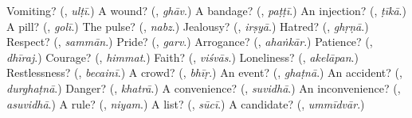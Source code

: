 \begin{tcolorbox}[breakable,colback=teal!4,colframe=teal!35!black,title={Before you move on}]
Vomiting? (\textbf{}, \emph{ulṭī}.) A wound? (\textbf{}, \emph{ghāv}.) A bandage? (\textbf{}, \emph{paṭṭī}.) An injection? (\textbf{}, \emph{ṭīkā}.) A pill? (\textbf{}, \emph{golī}.) The pulse? (\textbf{}, \emph{nabz}.) Jealousy? (\textbf{}, \emph{irṣyā}.) Hatred? (\textbf{}, \emph{ghṛṇā}.) Respect? (\textbf{}, \emph{sammān}.) Pride? (\textbf{}, \emph{garv}.) Arrogance? (\textbf{}, \emph{ahaṅkār}.) Patience? (\textbf{}, \emph{dhīraj}.) Courage? (\textbf{}, \emph{himmat}.) Faith? (\textbf{}, \emph{viśvās}.) Loneliness? (\textbf{}, \emph{akelāpan}.) Restlessness? (\textbf{}, \emph{becainī}.) A crowd? (\textbf{}, \emph{bhīṛ}.) An event? (\textbf{}, \emph{ghaṭnā}.) An accident? (\textbf{}, \emph{durghaṭnā}.) Danger? (\textbf{}, \emph{khatrā}.) A convenience? (\textbf{}, \emph{suvidhā}.) An inconvenience? (\textbf{}, \emph{asuvidhā}.) A rule? (\textbf{}, \emph{niyam}.) A list? (\textbf{}, \emph{sūcī}.) A candidate? (\textbf{}, \emph{ummīdvār}.)
\end{tcolorbox}
